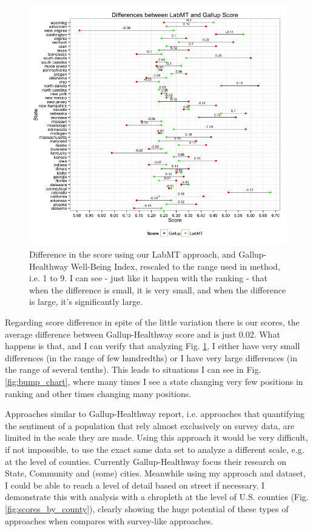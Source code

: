 \documentclass{llncs}
\begin{document}
\begin{figure}[!ht]
\centering
\includegraphics[width=\textwidth]{images/differences}
\caption{Difference in the score using our LabMT approach, and Gallup-Healthway Well-Being Index, rescaled to the range used in \cite{Dodds2009,Dodds2011} method, i.e. 1 to 9. I can see - just like it happen with the ranking - that when the difference is small, it is very small, and when the difference is large, it's significantly large.}
\label{fig:differences}
\end{figure}

Regarding score difference in spite of the little variation there is our scores, the average difference between Gallup-Healthway score and is just 0.02. What happens is that, and I can verify that analyzing Fig. \ref{fig:differences}, I either have very small differences (in the range of few hundredths) or I have very large differences (in the range of several tenths). This leads to situations I can see in Fig. \ref{fig:bump_chart}, where many times I see a state changing very few positions in ranking and other times changing many positions.

Approaches similar to Gallup-Healthway report, i.e. approaches that quantifying the sentiment of a population that rely almost exclusively on survey data, are limited in the scale they are made. Using this approach it would be very difficult, if not impossible, to use the exact same data set to analyze a different scale, e.g. at the level of counties. Currently Gallup-Healthway focus their research on State, Community and (some) cities. Meanwhile using my approach and dataset, I could be able to reach a level of detail based on street if necessary. I demonstrate this with analysis with a chropleth at the level of U.S. counties (Fig. \ref{fig:scores_by_county}), clearly showing the huge potential of these types of approaches when compares with survey-like approaches.
\end{document}
